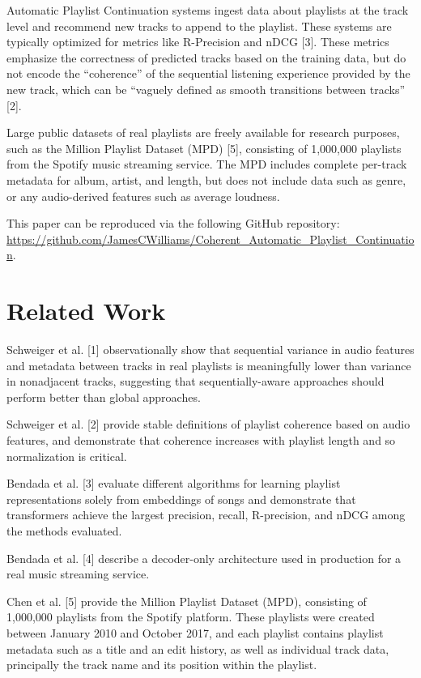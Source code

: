 \documentclass[conference]{IEEEtran}
\begin{document}
Automatic Playlist Continuation systems ingest data about playlists at the track level and recommend new tracks to append to the playlist. 
These systems are typically optimized for metrics like R-Precision and nDCG [3]. These metrics emphasize the correctness of 
predicted tracks based on the training data, but do not encode the ``coherence'' of the sequential listening experience provided by the new track, 
which can be ``vaguely defined as smooth transitions between tracks'' [2]. 

Large public datasets of real playlists are freely available for research purposes, such as the Million Playlist Dataset (MPD) [5],
consisting of 1,000,000 playlists from the Spotify music streaming service. The MPD includes complete per-track metadata for album, 
artist, and length, but does not include data such as genre, or any audio-derived features such as average loudness.

This paper can be reproduced via the following GitHub repository: \url{https://github.com/JamesCWilliams/Coherent_Automatic_Playlist_Continuation}.

\section{Related Work}

Schweiger et al. [1] observationally show that sequential variance in audio features and metadata between tracks in real 
playlists is meaningfully lower than variance in nonadjacent tracks, suggesting that sequentially-aware approaches should perform 
better than global approaches.

Schweiger et al. [2] provide stable definitions of playlist coherence based on audio features, and demonstrate that coherence 
increases with playlist length and so normalization is critical.

Bendada et al. [3] evaluate different algorithms for learning playlist representations solely from embeddings of songs 
and demonstrate that transformers achieve the largest precision, recall, R-precision, and nDCG among the methods evaluated.

Bendada et al. [4] describe a decoder-only architecture used in production for a real music streaming service.

Chen et al. [5] provide the Million Playlist Dataset (MPD), consisting of 1,000,000 playlists from the Spotify platform. 
These playlists were created between January 2010 and October 2017, and each playlist contains playlist metadata such as a 
title and an edit history, as well as individual track data, principally the track name and its position within the playlist.
\end{document}
